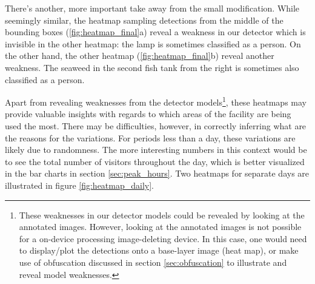 There's another, more important take away from the small modification. While seemingly similar, the heatmap sampling detections from the middle of the bounding boxes (\ref{fig:heatmap_final}a) reveal a weakness in our detector which is invisible in the other heatmap: the lamp is sometimes classified as a person. On the other hand, the other heatmap (\ref{fig:heatmap_final}b) reveal another weakness. The seaweed in the second fish tank from the right is sometimes also classified as a person.   

Apart from revealing weaknesses from the detector models\footnote{These weaknesses in our detector models could be revealed by looking at the annotated images. However, looking at the annotated images is not possible for a on-device processing image-deleting device. In this case, one would need to display/plot the detections onto a base-layer image (heat map), or make use of obfuscation discussed in section \ref{sec:obfuscation} to illustrate and reveal model weaknesses.}, these heatmaps may provide valuable insights with regards to which areas of the facility are being used the most. There may be difficulties, however, in correctly inferring what are the reasons for the variations. For periods less than a day, these variations are likely due to randomness. The more interesting numbers in this context would be to see the total number of visitors throughout the day, which is better visualized in the bar charts in section \ref{sec:peak_hours}. Two heatmaps for separate days are illustrated in figure \ref{fig:heatmap_daily}.

